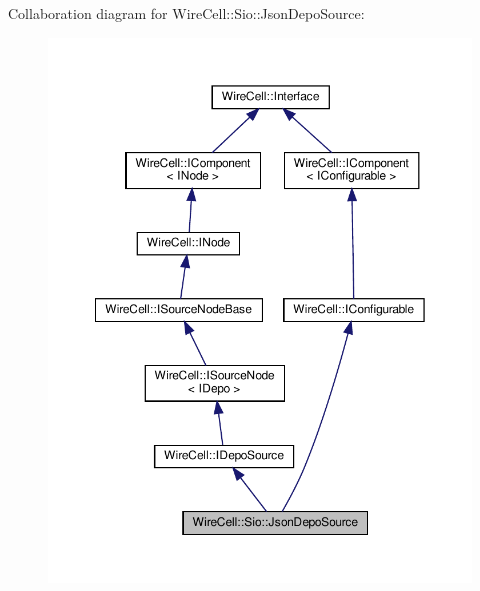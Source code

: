 Collaboration diagram for Wire\+Cell\+:\+:Sio\+:\+:Json\+Depo\+Source\+:
\nopagebreak
\begin{figure}[H]
\begin{center}
\leavevmode
\includegraphics[width=350pt]{class_wire_cell_1_1_sio_1_1_json_depo_source__coll__graph}
\end{center}
\end{figure}
